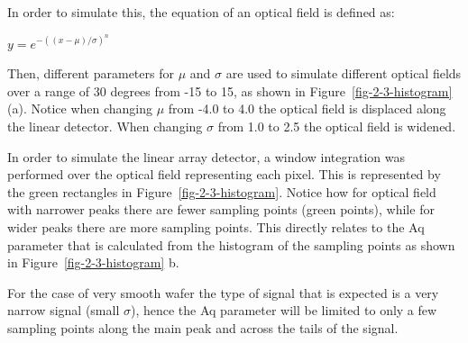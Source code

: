 \documentclass[
  letterpaper,
  DIV=11,
  numbers=noendperiod,
  oneside]{scrreprt}
\begin{document}
In order to simulate this, the equation of an optical field is defined
as:

\(y = e^{-((x-\mu)/\sigma)^n}\)

Then, different parameters for \(\mu\) and \(\sigma\) are used to
simulate different optical fields over a range of 30 degrees from -15 to
15, as shown in Figure~\ref{fig-2-3-histogram} (a). Notice when changing
\(\mu\) from -4.0 to 4.0 the optical field is displaced along the linear
detector. When changing \(\sigma\) from 1.0 to 2.5 the optical field is
widened.

In order to simulate the linear array detector, a window integration was
performed over the optical field representing each pixel. This is
represented by the green rectangles in Figure~\ref{fig-2-3-histogram}.
Notice how for optical field with narrower peaks there are fewer
sampling points (green points), while for wider peaks there are more
sampling points. This directly relates to the Aq parameter that is
calculated from the histogram of the sampling points as shown in
Figure~\ref{fig-2-3-histogram} b.

For the case of very smooth wafer the type of signal that is expected is
a very narrow signal (small \(\sigma\)), hence the Aq parameter will be
limited to only a few sampling points along the main peak and across the
tails of the signal.
\end{document}
